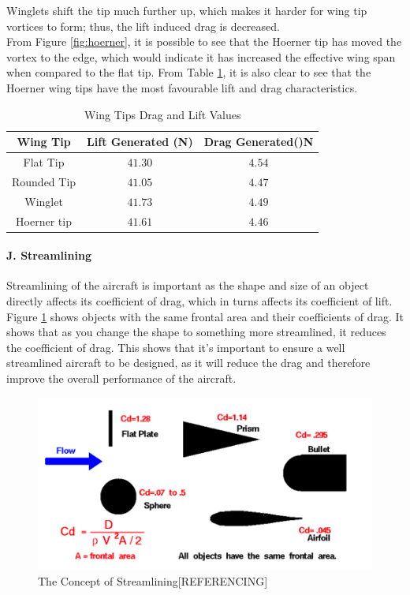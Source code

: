 \documentclass[12pt]{article}
\begin{document}
\noindent Winglets shift the tip much further up, which makes it harder for wing tip vortices to form; thus, the lift induced drag is decreased. \\

\noindent From Figure \ref{fig:hoerner}, it is possible to see that the Hoerner tip has moved the vortex to the edge, which would indicate it has increased the effective wing span when compared to the flat tip. From Table \ref{fig:wingdrag}, it is also clear to see that the Hoerner wing tips have the most favourable lift and drag characteristics. \\

\begin{table}[h]
\centering
\begin{tabular}{|c|c|c|}
\hline
\textbf{Wing Tip} &  \textbf{Lift Generated (N)} & \textbf{Drag Generated()N} 
\\ \hline Flat Tip & $41.30$ & $4.54$
\\ \hline Rounded Tip & $41.05$ & $4.47$
\\ \hline Winglet & $41.73$ & $4.49$
\\ \hline Hoerner tip & $41.61$ & $4.46$
\\ \hline
\end{tabular}
\caption{Wing Tips Drag and Lift Values }
\label{fig:wingdrag}
\end{table}

\paragraph{J. Streamlining} Streamlining of the aircraft is important as the shape and size of an object directly affects its coefficient of drag, which in turns affects its coefficient of lift. \\

\noindent Figure \ref{fig:streamline} shows objects with the same frontal area and their coefficients of drag. It shows that as you change the shape to something more streamlined, it reduces the coefficient of drag. This shows that it’s important to ensure a well streamlined aircraft to be designed, as it will reduce the drag and therefore improve the overall performance of the aircraft. \\

\begin{figure}[H]
\includegraphics[width=15cm, scale=1]{streamlinenasa.png}
\caption{The Concept of Streamlining[REFERENCING]}
\label{fig:streamline}
\end{figure}
\end{document}
